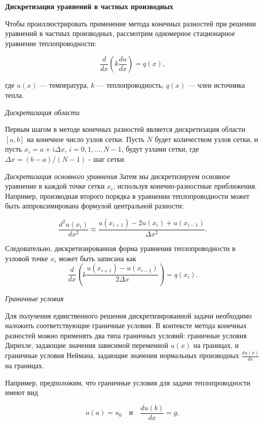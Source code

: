 \textbf{Дискретизация уравнений в частных производных}

Чтобы проиллюстрировать применение метода конечных разностей
при решении уравнений в частных производных, рассмотрим одномерное
стационарное уравнение теплопроводности:

\begin{equation*}
\frac{d}{dx}\left(k \frac{du}{dx}\right) = q(x),
\end{equation*}

где $u(x)$ — температура, $k$ — теплопроводность,
$q(x)$ — член источника тепла.

\textit{Дискретизация области}

Первым шагом в методе конечных разностей является
дискретизация области $[a, b]$ на конечное число узлов сетки.
Пусть $N$ будет количеством узлов сетки, и пусть
$x_i = a + i \Delta x$, $i = 0, 1, \ldots, N - 1$, будут узлами сетки,
где $\Delta x = (b - a) / (N - 1)$ - шаг сетки.

\textit{Дискретизация основного уравнения}
Затем мы дискретизируем основное уравнение в каждой точке сетки $x_i$,
используя конечно-разностные приближения.
Например, производная второго порядка в уравнении теплопроводности
может быть аппроксимирована формулой центральной разности:

\begin{equation*}
\frac{d^2u(x_i)}{dx^2} \approx \frac{u(x_{i+1}) - 2u(x_i) + u(x_{i-1})}{\Delta x^2}.
\end{equation*}

Следовательно, дискретизированная форма уравнения теплопроводности
в узловой точке $x_i$ может быть записана как
\begin{equation*}
\frac{d}{dx}\left(k \frac{u(x_{i+1}) - u(x_{i-1})}{2\Delta x}\right) = q(x_i).
\end{equation*}

\textit{Граничные условия}

Для получения единственного решения дискретизированной
задачи необходимо наложить соответствующие граничные условия.
В контексте метода конечных разностей можно применять два
типа граничных условий: граничные условия Дирихле,
задающие значения зависимой переменной $u(x)$ на границах,
и граничные условия Неймана, задающие значения нормальных
производных $\frac{du(x)}{dx}$ на границах.

Например, предположим, что граничные условия для
задачи теплопроводности имеют вид

\begin{equation*}
u(a) = u_0 \quad \text{и} \quad \frac{du(b)}{dx} = g,
\end{equation*}

